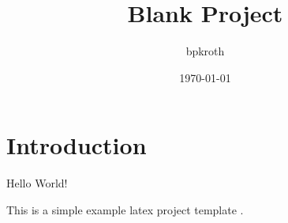 \documentclass{article}
\title{Blank Project}
\author{bpkroth}
\date{\today}
\begin{document}
\maketitle

\section{Introduction}

Hello World!

This is a simple example latex project template \cite{latex-project-template}.



\end{document}
